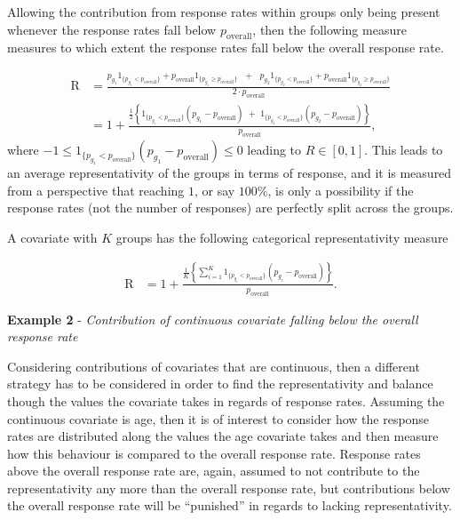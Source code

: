 \documentclass[
]{article}
\begin{document}
Allowing the contribution from response rates within groups only being
present whenever the response rates fall below \({p}_{\text{overall}}\),
then the following measure measures to which extent the response rates
fall below the overall response rate.

\begin{align}

\text{R} & = \frac{{p}_{g_1} 1_{  \{ {p}_{g_1} <{p}_{\text{overall}} \} }+
{p}_{\text{overall}} 1_{ \{{p}_{g_1} \geq {p}_{\text{overall}} \} 
}
\,\,\,\,+
\,\,\,\,
{p}_{g_2} 1_{ \{ 
{p}_{g_2} <{p}_{\text{overall}} \}
}+{p}_{\text{overall}} 
1_{ \{ {p}_{g_2} \geq {p}_{\text{overall}} \}} }
{2 \cdot {p}_{\text{overall}}} \\
& = 1+\frac{ \frac{1}{2} \left\{  1_{ \{ p_{g_1} < p_{\text{overall}} \} } \left( p_{g_1} - p_{\text{overall}} \right) \,\, + \,\,  1_{ \{ p_{g_2} < p_{\text{overall}} \} } \left( p_{g_2} - p_{\text{overall}} \right)  \right\}  }{p_{\text{overall}}},
\end{align} where
\(-1 \leq 1_{ \{ p_{g_1} < p_{\text{overall}} \} } \left( p_{g_1} - p_{\text{overall}} \right) \leq 0\)
leading to \(R \in [0,1]\). This leads to an average representativity of
the groups in terms of response, and it is measured from a perspective
that reaching \(1\), or say \(100 \%\), is only a possibility if the
response rates (not the number of responses) are perfectly split across
the groups.

\newline

A covariate with \(K\) groups has the following categorical
representativity measure

\begin{align}

\text{R} & = 
1+\frac{ \frac{1}{K} \left\{ \sum_{i=1}^K 1_{ \{ p_{g_i} < p_{\text{overall}} \} } \left( p_{g_i} - p_{\text{overall}} \right)  \right\}  }{p_{\text{overall}}}.
\end{align}

\textbf{Example 2} - \emph{Contribution of continuous covariate falling
below the overall response rate}

\newline Considering contributions of covariates that are continuous,
then a different strategy has to be considered in order to find the
representativity and balance though the values the covariate takes in
regards of response rates. Assuming the continuous covariate is age,
then it is of interest to consider how the response rates are
distributed along the values the age covariate takes and then measure
how this behaviour is compared to the overall response rate. Response
rates above the overall response rate are, again, assumed to not
contribute to the representativity any more than the overall response
rate, but contributions below the overall response rate will be
``punished'' in regards to lacking representativity.
\end{document}

